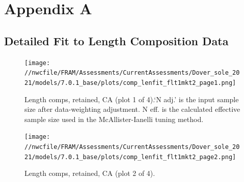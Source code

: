 \documentclass[11pt,
  english,
  a4paper,
]{article}
\begin{document}
\tagmcend\tagstructend

\clearpage


\hypertarget{appendix-a}{%
\section{Appendix A}\label{appendix-a}}

\leavevmode\tagmcend\tagstructend


\hypertarget{len-fit-data}{%
\subsection{Detailed Fit to Length Composition Data}\label{len-fit-data}}

\leavevmode\tagmcend\tagstructend


\begin{figure}
\centering
\texttt{[image: //nwcfile/FRAM/Assessments/CurrentAssessments/Dover\_sole\_2021/models/7.0.1\_base/plots/comp\_lenfit\_flt1mkt2\_page1.png]}
\caption{Length comps, retained, CA (plot 1 of 4).`N adj.' is the input sample size after data-weighting adjustment. N eff. is the calculated effective sample size used in the McAllister-Ianelli tuning method.\label{fig:comp_lenfit_flt1mkt2_page1}}
\end{figure}

\tagmcend\tagstructend


\begin{figure}
\centering
\texttt{[image: //nwcfile/FRAM/Assessments/CurrentAssessments/Dover\_sole\_2021/models/7.0.1\_base/plots/comp\_lenfit\_flt1mkt2\_page2.png]}
\caption{Length comps, retained, CA (plot 2 of 4).\label{fig:comp_lenfit_flt1mkt2_page2}}
\end{figure}

\tagmcend\tagstructend

\end{document}
